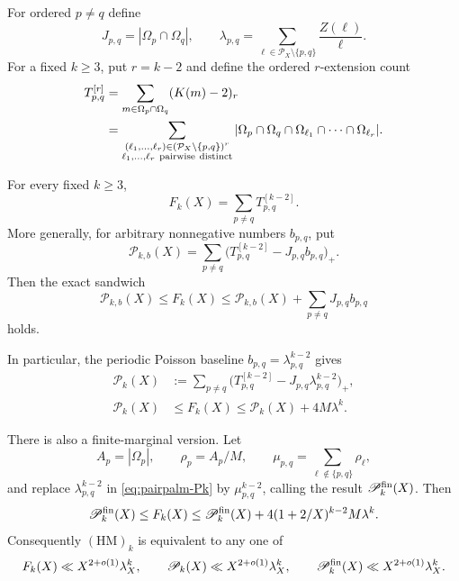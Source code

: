 For ordered $p\ne q$ define
\[
 J_{p,q}=|\Omega_p\cap\Omega_q|,
 \qquad
 \lambda_{p,q}
 =\sum_{\ell\in\mathcal P_X\setminus\{p,q\}}
       \frac{Z(\ell)}\ell.
\]
For a fixed $k\geq3$, put $r=k-2$ and define the ordered
$r$-extension count
\begin{align}
 T_{p,q}^{[r]}
 &=\sum_{m\in\Omega_p\cap\Omega_q}(K(m)-2)_r
                                                        \label{eq:pairpalm-T}\\
 &=\sum_{\substack{
     (\ell_1,\ldots,\ell_r)
       \in(\mathcal P_X\setminus\{p,q\})^r\\
     \ell_1,\ldots,\ell_r\ \mathrm{pairwise\ distinct}}}
   |\Omega_p\cap\Omega_q\cap
     \Omega_{\ell_1}\cap\cdots\cap\Omega_{\ell_r}|. \notag
\end{align}

\begin{theorem}
\label{thm:pairpalm-hierarchy}
For every fixed $k\geq3$,
\begin{equation}\label{eq:pairpalm-anchor-identity}
 \boxed{F_k(X)=\sum_{p\ne q}T_{p,q}^{[k-2]}.}
\end{equation}
More generally, for arbitrary nonnegative numbers $b_{p,q}$, put
\[
 \mathscr P_{k,b}(X)
 =\sum_{p\ne q}
   \bigl(T_{p,q}^{[k-2]}-J_{p,q}b_{p,q}\bigr)_+.
\]
Then the exact sandwich
\begin{equation}\label{eq:pairpalm-general-sandwich}
 \mathscr P_{k,b}(X)
 \leq F_k(X)
 \leq\mathscr P_{k,b}(X)+\sum_{p\ne q}J_{p,q}b_{p,q}
\end{equation}
holds.

In particular, the periodic Poisson baseline
$b_{p,q}=\lambda_{p,q}^{k-2}$ gives
\begin{align}
 \mathscr P_k(X)
 &:=\sum_{p\ne q}
   \bigl(T_{p,q}^{[k-2]}
          -J_{p,q}\lambda_{p,q}^{k-2}\bigr)_+,
                                                        \label{eq:pairpalm-Pk}\\
 \mathscr P_k(X)
 &\leq F_k(X)
 \leq\mathscr P_k(X)+4M\lambda^k.                    \label{eq:pairpalm-periodic-sandwich}
\end{align}

There is also a finite-marginal version.  Let
\[
 A_p=|\Omega_p|,\qquad \rho_p=A_p/M,\qquad
 \mu_{p,q}=\sum_{\ell\notin\{p,q\}}\rho_\ell,
\]
and replace $\lambda_{p,q}^{k-2}$ in
\eqref{eq:pairpalm-Pk} by $\mu_{p,q}^{k-2}$, calling the result
$\mathscr P_k^{\rm fin}(X)$.  Then
\begin{equation}\label{eq:pairpalm-finite-sandwich}
 \mathscr P_k^{\rm fin}(X)
 \leq F_k(X)
 \leq\mathscr P_k^{\rm fin}(X)
   +4(1+2/X)^{k-2}M\lambda^k.
\end{equation}
Consequently $(\mathrm{HM})_k$ is equivalent to any one of
\begin{equation}\label{eq:pairpalm-equivalence}
 F_k(X)\ll X^{2+o(1)}\lambda_X^k,
 \qquad
 \mathscr P_k(X)\ll X^{2+o(1)}\lambda_X^k,
 \qquad
 \mathscr P_k^{\rm fin}(X)\ll X^{2+o(1)}\lambda_X^k.
\end{equation}
\end{theorem}

